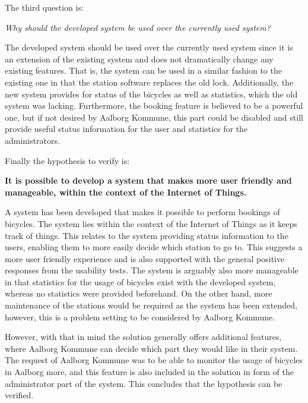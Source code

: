 The third question is:
\begin{center}
	\textit{Why should the developed system be used over the currently used system?}
\end{center}

The developed system should be used over the currently used system since it is an extension of the existing system and does not dramatically change any existing features.
That is, the system can be used in a similar fashion to the existing one in that the station software replaces the old lock. 
Additionally, the new system provides for status of the bicycles as well as statistics, which the old system was lacking. 
Furthermore, the booking feature is believed to be a powerful one, but if not desired by Aalborg Kommune, this part could be disabled and still provide useful status information for the user and statistics for the administrators.

Finally the hypothesis to verify is:
\begin{center}
	\textbf{It is possible to develop a system that makes \bycykel more user friendly and manageable, within the context of the Internet of Things.}
\end{center}

A system has been developed that makes it possible to perform bookings of bicycles.
The system lies within the context of the Internet of Things as it keeps track of things.
This relates to  the system providing status information to the users, enabling them to more easily decide which station to go to.
This suggests a more user friendly experience and is also supported with the general positive responses from the usability tests.
The system is arguably also more manageable in that statistics for the usage of bicycles exist with the developed system, whereas no statistics were provided beforehand.
On the other hand, more maintenance of the stations would be required as the system has been extended, however, this is a problem setting to be considered by Aalborg Kommune.
 
However, with that in mind the solution generally offers additional features, where Aalborg Kommune can decide which part they would like in their system.
The request of Aalborg Kommune was to be able to monitor the usage of bicycles in Aalborg more, and this feature is also included in the solution in form of the administrator part of the system.
This concludes that the hypothesis can be verified.